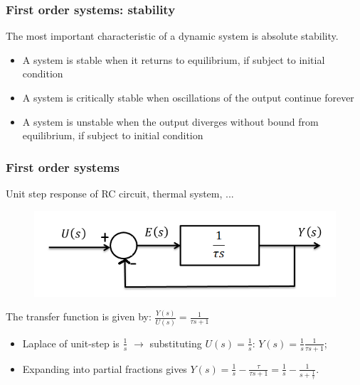 \begin{frame}
\frametitle{First order systems: stability}
	The most important characteristic of a dynamic system is absolute stability.
	\begin{itemize}
		\item A system is stable when it returns to equilibrium, if subject to initial condition
		\item A system is critically stable when oscillations of the output continue forever
		\item A system is unstable when the output diverges without bound from equilibrium, if subject to initial condition
	\end{itemize}
\end{frame}

\begin{frame}
\frametitle{First order systems}
\begin{example}
	Unit step response of RC circuit, thermal system, ...
	\vspace{-0.8em}
	\begin{figure}
		\includegraphics[width=0.6\linewidth]{Afbeelding1}
	\end{figure}
	\vspace{-0.8em}
	The transfer function is given by: $\frac{Y(s)}{U(s)} = \frac{1}{\tau s +1}$
	\begin{itemize}
		\item Laplace of unit-step is $\frac{1}{s}$ $\rightarrow$ substituting $U(s)= \frac{1}{s}$: $Y(s) = \frac{1}{s}\frac{1}{\tau s +1}$;
		\item Expanding into partial fractions gives $Y(s)= \frac{1}{s} - \frac{\tau}{\tau s +1} = \frac{1}{s} - \frac{1}{s+\frac{1}{\tau}}$.
	\end{itemize}
\end{example}
\end{frame}

